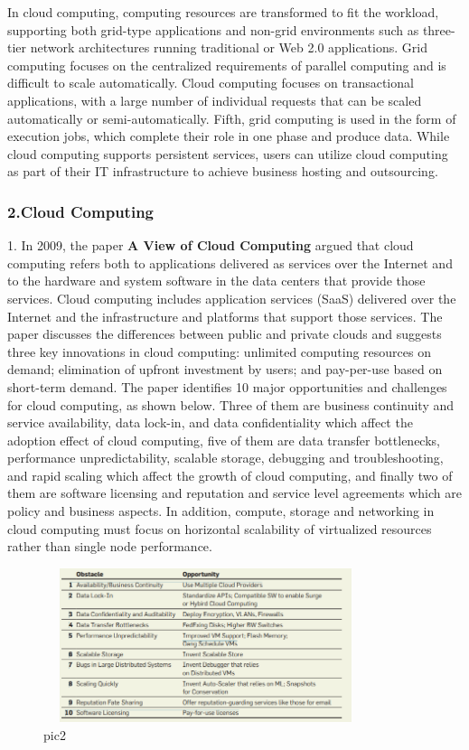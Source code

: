 \documentclass[a4paper,twoside]{scrbook}
\begin{document}
\begin{CJK}{UTF8}{gbsn}
In cloud computing, computing resources are transformed to fit the workload, supporting both grid-type applications and non-grid environments such as three-tier network architectures running traditional or Web 2.0 applications. Grid computing focuses on the centralized requirements of parallel computing and is difficult to scale automatically. Cloud computing focuses on transactional applications, with a large number of individual requests that can be scaled automatically or semi-automatically.
Fifth, grid computing is used in the form of execution jobs, which complete their role in one phase and produce data. While cloud computing supports persistent services, users can utilize cloud computing as part of their IT infrastructure to achieve business hosting and outsourcing.





\subsubsection{2.Cloud Computing}
1. In 2009, the paper \textbf {A View of Cloud Computing}\cite{armbrust2010view} argued that cloud computing refers both to applications delivered as services over the Internet and to the hardware and system software in the data centers that provide those services. Cloud computing includes application services (SaaS) delivered over the Internet and the infrastructure and platforms that support those services. The paper discusses the differences between public and private clouds and suggests three key innovations in cloud computing: unlimited computing resources on demand; elimination of upfront investment by users; and pay-per-use based on short-term demand. The paper identifies 10 major opportunities and challenges for cloud computing, as shown below. Three of them are business continuity and service availability, data lock-in, and data confidentiality which affect the adoption effect of cloud computing, five of them are data transfer bottlenecks, performance unpredictability, scalable storage, debugging and troubleshooting, and rapid scaling which affect the growth of cloud computing, and finally two of them are software licensing and reputation and service level agreements which are policy and business aspects. In addition, compute, storage and networking in cloud computing must focus on horizontal scalability of virtualized resources rather than single node performance.

\begin{figure}
\centering
\includegraphics[height=4.5cm,width=9.5cm]{cloud10.png}
\caption{pic2}
\end{figure}


\end{CJK}
\end{document}
